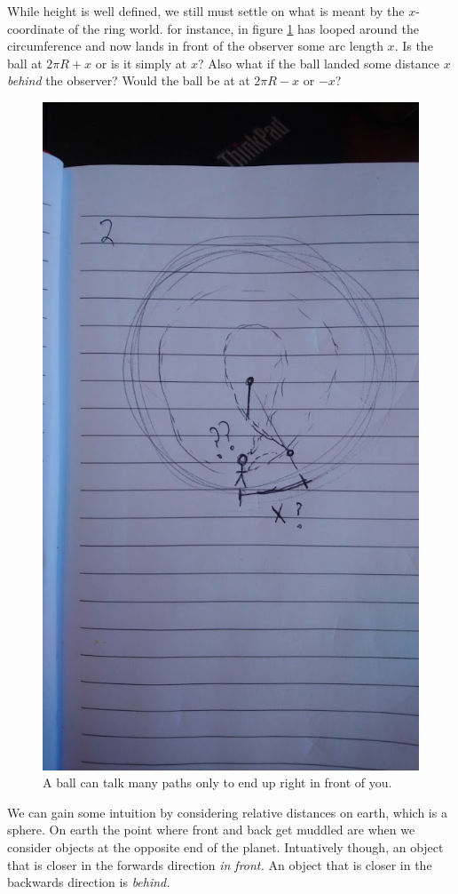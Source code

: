 \documentclass{amsart}
\theoremstyle{definition}
\begin{document}
While height is well defined, we still must settle on what is meant by
the $x$-coordinate of the ring world.  for instance, in figure
\ref{fig:what_is_x} has looped around the circumference and now lands
in front of the observer some arc length $x$.  Is the ball at $2\pi R
+ x$ or is it simply at $x$? Also what if the ball landed some
distance $x$ \textit{behind} the observer?  Would the ball be at at
$2\pi R - x$ or $-x$? \newline

\begin{figure}
	\centering
	\includegraphics[width=0.7\linewidth]{figures/define_horizontal_pos_rough.JPG}
	\caption{A ball can talk many paths only to end up right in front of you.}
	\label{fig:what_is_x}
\end{figure}

We can gain some intuition by considering relative distances on earth, which is a sphere. On earth the point where front and back get muddled
 are when we consider objects at the opposite end of the planet. Intuatively though, an object that is closer in the forwards direction \textit{in front.} 
 An object that is closer in the backwards direction is \textit{behind.} \newline
\end{document}

